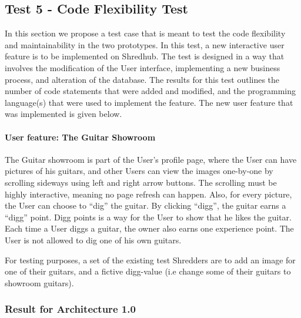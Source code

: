 \subsection{Test 5 - Code Flexibility Test}
In this section we propose a test case that is meant to test the code flexibility and maintainability in the two prototypes. In this test, a new interactive user feature is to be implemented on Shredhub. The test is designed in a way that involves the modification of the User interface, implementing a new business process, and alteration of the database. The results for this test outlines the number of code statements that were added and modified, and the programming language(s) that were used to implement the feature. The new user feature that was implemented is given below.

\paragraph{User feature: The Guitar Showroom}
The Guitar showroom is part of the User's profile page, where the User can have pictures of his guitars,  and other Users can view the images one-by-one by scrolling sideways using left and right arrow buttons. The scrolling must be highly interactive, meaning no page refresh can happen.  Also, for every picture, the User can choose to ``dig'' the guitar. By clicking ``digg'', the guitar earns a ``digg'' point. Digg points is a way for the User to show that he likes the guitar. Each time a User diggs a guitar, the owner also earns one experience point. The User is not allowed to dig one of his own guitars. 

For testing purposes, a set of the existing test Shredders are to add an image for one of their guitars, and a fictive digg-value (i.e change some of their guitars to showroom guitars).

\subsubsection{Result for Architecture 1.0}
%

